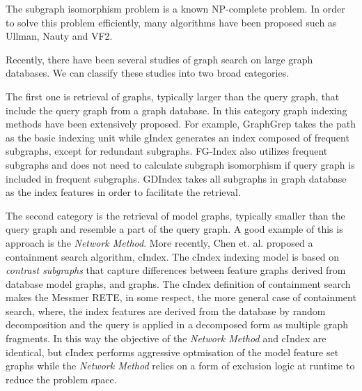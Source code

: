 The subgraph isomorphism problem is a known  NP-complete problem\cite{cook1971_np}.
In order to solve this problem efficiently, many algorithms have been proposed such as Ullman\cite{ullmann1976}, Nauty\cite{mckay1981} and VF2\cite{cordella2001_vf2}.

Recently, there have been several studies of graph search on large graph databases. We can classify these studies into two broad categories.

The first one is retrieval of graphs, typically larger than the query graph, that include the query graph from a graph database. 
In this category graph indexing methods have been extensively proposed. 
For example, GraphGrep\cite{shasha_wang_giugno2002_grapgrep} takes the path as the basic indexing unit while gIndex\cite{yan_yu_han2004_gindex} generates an index composed of frequent subgraphs, except for redundant subgraphs. 
FG-Index\cite{cheng2007_fgindex} also utilizes frequent subgraphs and does not need to calculate subgraph isomorphism if query graph is included in frequent subgraphs.
GDIndex\cite{williams_huan_wang2007_gdindex} takes all subgraphs in graph database as the index features in order to facilitate the retrieval.

The second category is the retrieval of model graphs, typically smaller than the query graph and resemble a part of the query graph. 
A good  example of this is approach is the \textit{Network Method}\cite{messmer_bunke2000}. More recently, Chen et. al. proposed a containment search algorithm, cIndex\cite{chen2007_cindex}. 
The cIndex indexing model is based on  \textit{contrast subgraphs} that capture differences between feature graphs derived from database model graphs, and graphs. 
The cIndex definition of containment search makes the Messmer RETE, in some respect, the more general case of containment search, where, the index features are derived from the database by random decomposition and the query is applied in a decomposed form as multiple graph fragments. 
In this way the objective of the \textit{Network Method} and cIndex are identical, but cIndex performs aggressive optmisation of the model feature set graphs while the \textit{Network Method} relies on a form of  exclusion logic at runtime to reduce the problem space.
